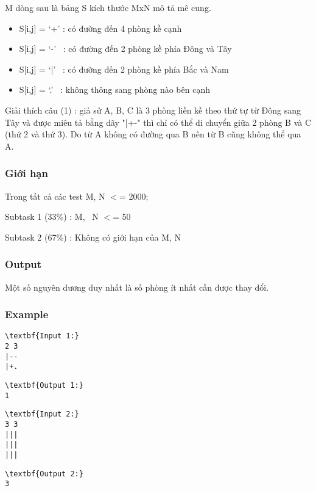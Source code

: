 M dòng sau là bảng S kích thước MxN mô tả mê cung.
\begin{itemize}
	\item S[i,j] = ‘+’ : có đường đến 4 phòng kề cạnh
	\item S[i,j] = ‘-’  : có đường đến 2 phòng kề phía Đông và Tây
	\item S[i,j] = ‘|’  : có đường đến 2 phòng kề phía Bắc và Nam
	\item S[i,j] = ‘.’  : không thông sang phòng nào bên cạnh
\end{itemize}

Giải thích câu (1) : giả sử A, B, C là 3 phòng liền kề theo thứ tự từ Đông sang Tây và được miêu tả bằng dãy "|+-" thì chỉ có thể di chuyển giữa 2 phòng B và C (thứ 2 và thứ 3). Do từ A không có đường qua B nên từ B cũng không thể qua A.

\subsubsection{Giới hạn}

Trong tất cả các test M, N $<$= 2000;

Subtask 1 (33\%) : M,  N $<$= 50

Subtask 2 (67\%) : Không có giới hạn của M, N

\subsubsection{Output}

Một số nguyên dương duy nhất là số phòng ít nhất cần được thay đổi.

\subsubsection{Example}
\begin{verbatim}
\textbf{Input 1:}
2 3
|--
|+.\end{verbatim}
\begin{verbatim}
\textbf{Output 1:}
1\end{verbatim}
\begin{verbatim}
\textbf{Input 2:}
3 3
|||
|||
|||\end{verbatim}
\begin{verbatim}
\textbf{Output 2:}
3\end{verbatim}